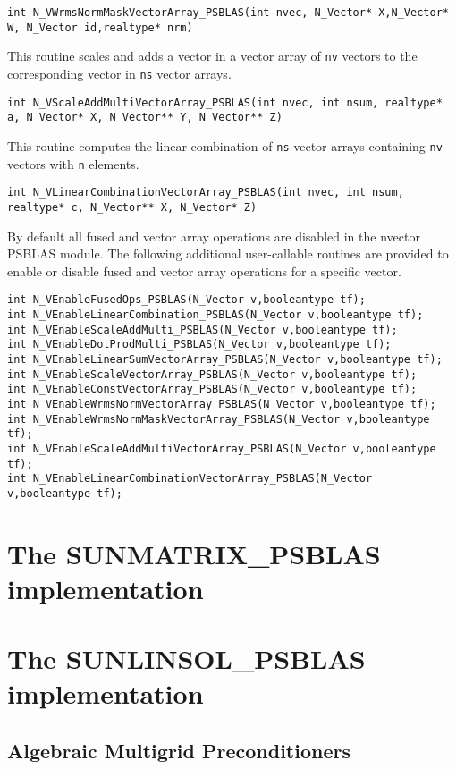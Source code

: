 \documentclass[twoside,a4paper]{refart}
\begin{document}
\begin{description}
 	 \lstinline[style=CStyle]|int N_VWrmsNormMaskVectorArray_PSBLAS(int nvec, N_Vector* X,N_Vector* W, N_Vector id,realtype* nrm)|
 	
 	\item[\fbox{\texttt{N\_VScaleAddMultiVectorArray\_PSBLAS}}] This routine scales and adds a vector in a vector array of
 	\lstinline[style=CStyle]|nv| vectors to the corresponding vector in \lstinline[style=CStyle]|ns| vector arrays.
 	
 	 \lstinline[style=CStyle]|int N_VScaleAddMultiVectorArray_PSBLAS(int nvec, int nsum, realtype* a, N_Vector* X, N_Vector** Y, N_Vector** Z)|
 	
 	\item[\fbox{\texttt{N\_VLinearCombinationVectorArray\_PSBLAS}}] This routine computes the linear combination of \lstinline[style=CStyle]|ns| vector
 	arrays containing \lstinline[style=CStyle]|nv| vectors with \lstinline[style=CStyle]|n| elements.
 	
 	 \lstinline[style=CStyle]|int N_VLinearCombinationVectorArray_PSBLAS(int nvec, int nsum, realtype* c, N_Vector** X, N_Vector* Z)|
\end{description}

By default all fused and vector array operations are disabled in the nvector PSBLAS module.
The following additional user-callable routines are provided to enable or disable fused and vector
array operations for a specific vector.
\begin{lstlisting}[style=CStyle]
int N_VEnableFusedOps_PSBLAS(N_Vector v,booleantype tf);
int N_VEnableLinearCombination_PSBLAS(N_Vector v,booleantype tf);
int N_VEnableScaleAddMulti_PSBLAS(N_Vector v,booleantype tf);
int N_VEnableDotProdMulti_PSBLAS(N_Vector v,booleantype tf);
int N_VEnableLinearSumVectorArray_PSBLAS(N_Vector v,booleantype tf);
int N_VEnableScaleVectorArray_PSBLAS(N_Vector v,booleantype tf);
int N_VEnableConstVectorArray_PSBLAS(N_Vector v,booleantype tf);
int N_VEnableWrmsNormVectorArray_PSBLAS(N_Vector v,booleantype tf);
int N_VEnableWrmsNormMaskVectorArray_PSBLAS(N_Vector v,booleantype tf);
int N_VEnableScaleAddMultiVectorArray_PSBLAS(N_Vector v,booleantype tf);
int N_VEnableLinearCombinationVectorArray_PSBLAS(N_Vector v,booleantype tf);
\end{lstlisting}

\section{The SUNMATRIX\_PSBLAS implementation}\label{sec:sunmatrix}

\section{The SUNLINSOL\_PSBLAS implementation}\label{sec:sunlinsol}

\subsection{Algebraic Multigrid Preconditioners}

\printbibliography
\end{document}

